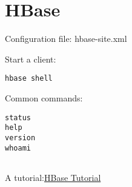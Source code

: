 \section{HBase}

Configuration file: hbase-site.xml

Start a client: 
\begin{verbatim}
hbase shell
\end{verbatim}


Common commands:

\begin{verbatim}
status
help
version
whoami


\end{verbatim}

A tutorial:\href{http://www.tuicool.com/articles/FZBNba}{HBase Tutorial}









